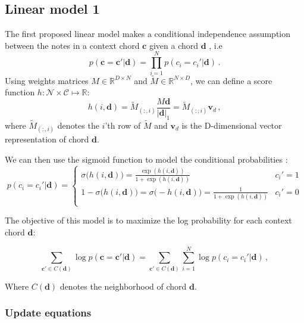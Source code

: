 \documentclass[12pt]{article}\pagestyle{myheadings}
\newcommand{\R}{\mathbb{R}}
\newcommand{\M}{\tilde{M}}
\newcommand{\boldc}{\boldsymbol c}
\newcommand{\boldd}{\boldsymbol d}
\newcommand{\boldvd}{\boldsymbol v_d}
\begin{document}
 
 \subsection{Linear model 1}

The first proposed linear model makes a conditional independence assumption between the notes in a context chord $\boldc$ given a chord $\boldd$ , i.e 
\begin{equation}
p(\boldc =\boldc' | \boldd) = \prod_{i=1}^N  p(c_i =c_i'|  \boldd) \,.
\end{equation} 
Using weights matrices $M\in \R^{D \times N}$ and $\M\in \R^{N \times D}$, we can define a score function $h: \mathcal{N} \times \mathcal{C} \mapsto \mathbb{R} :$
\begin{equation}
h(i,\boldd) = \M_{(:,i)} \frac{M \boldd}{| \boldd |_1} =  \M_{(:,i)} \boldvd \,,
\end{equation}
where $\M_{(:,i)}$ denotes the $i$'th row of $\M$ and $\boldvd$ is the D-dimensional vector representation  of chord $\boldd$.

We can then use the sigmoid function to model the conditional probabilities :
\begin{equation}
p(c_i =c_i'|  \boldd) = \left\{
                \begin{array}{lll}
                  \sigma\big( h(i,\boldd) \big) = \frac{\exp(h(i,\boldd))}{1 + \exp(h(i,\boldd))} & c_i' = 1 \\
                  1- \sigma\big( h(i,\boldd) \big) = \sigma\big( - h(i,\boldd) \big) = \frac{1}{1 + \exp(h(i,\boldd))} & c_i' = 0\\
                \end{array}
              \right.
\end{equation}


The objective of this model is to maximize the log probability for each context chord $\boldd$:

\begin{equation}
\sum_{\boldc' \in C(\boldd)} \log p(\boldc = \boldc'|\boldd)
=  \sum_{\boldc' \in C(\boldd)} \sum_{i=1}^N \log p(c_i = c_i'|  \boldd) \,,
\label{eq:c2v_obj}
\end{equation}

Where $C(\boldd)$ denotes the neighborhood of chord $\boldd$.

\subsubsection*{Update equations}
\end{document}
